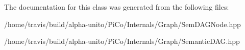 \-The documentation for this class was generated from the following files\-:\begin{DoxyCompactItemize}
\item 
/home/travis/build/alpha-\/unito/\-Pi\-Co/\-Internals/\-Graph/\-Sem\-D\-A\-G\-Node.\-hpp\item 
/home/travis/build/alpha-\/unito/\-Pi\-Co/\-Internals/\-Graph/\-Semantic\-D\-A\-G.\-hpp\end{DoxyCompactItemize}
